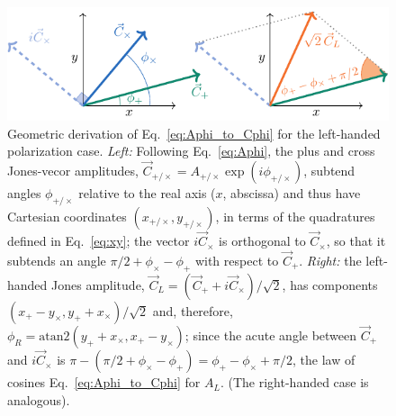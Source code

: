 \documentclass[aps,prd,twocolumn,superscriptaddress,preprintnumbers,floatfix,nofootinbib]{revtex4-2}
\begin{document}
\newcommand{\xp}{x_{+}}
\newcommand{\xc}{x_{\times}}
\newcommand{\xpc}{x_{+/\times}}
\newcommand{\yp}{y_{+}}
\newcommand{\yc}{y_{\times}}
\newcommand{\ypc}{y_{+/\times}}

\newcommand{\xr}{x_{R}}
\newcommand{\xl}{x_{L}}
\newcommand{\xrl}{x_{R/L}}
\newcommand{\yr}{y_{R}}
\newcommand{\yl}{y_{L}}
\newcommand{\yrl}{y_{R/L}}


\begin{figure}
\includegraphics[width=\columnwidth]{diagram_apac}
\caption{Geometric derivation of Eq.~\eqref{eq:Aphi_to_Cphi} for the left-handed polarization case.
\emph{Left:} Following Eq.~\eqref{eq:Aphi}, the plus and cross Jones-vecor amplitudes, $\vec{C}_{+/\times} = A_{+/\times} \exp(i \phi_{+/\times})$, subtend angles $\phi_{+/\times}$ relative to the real axis ($x$, abscissa) and thus have Cartesian coordinates $\left(\xpc, \ypc \right)$, in terms of the quadratures defined in Eq.~\eqref{eq:xy}; the vector $i\vec{C}_\times$ is orthogonal to $\vec{C}_\times$, so that it subtends an angle $\pi/2 + \phi_\times-\phi_+$ with respect to $\vec{C}_+$.
\emph{Right:} the left-handed Jones amplitude, $\vec{C}_L = (\vec{C}_+ + i \vec{C}_\times)/\sqrt{2}$, has components $\left(\xp - \yc, \yp + \xc\right)/\sqrt{2}$ and, therefore, $\phi_R = \mathrm{atan2}( \yp + \xc, \xp - \yc)$; since the acute angle between $\vec{C}_+$ and $i\vec{C}_\times$ is $\pi - (\pi /2 + \phi_\times - \phi_+) = \phi_+ - \phi_\times + \pi/2$, the law of cosines Eq.~\eqref{eq:Aphi_to_Cphi} for $A_L$. (The right-handed case is analogous).
}
\label{fig:diagram_apac}
\end{figure}
\end{document}
